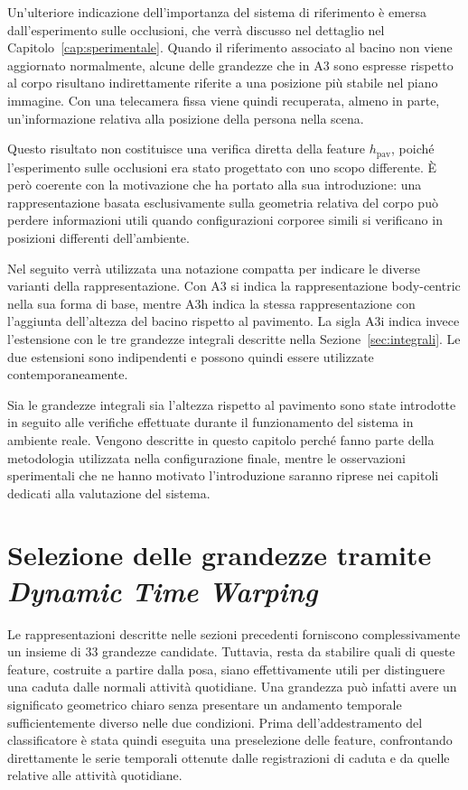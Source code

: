 Un'ulteriore indicazione dell'importanza del sistema di riferimento è emersa dall'esperimento sulle occlusioni, che verrà discusso nel dettaglio nel Capitolo~\ref{cap:sperimentale}. Quando il riferimento associato al bacino non viene aggiornato normalmente, alcune delle grandezze che in A3 sono espresse rispetto al corpo risultano indirettamente riferite a una posizione più stabile nel piano immagine. Con una telecamera fissa viene quindi recuperata, almeno in parte, un'informazione relativa alla posizione della persona nella scena.

Questo risultato non costituisce una verifica diretta della feature $h_{\text{pav}}$, poiché l'esperimento sulle occlusioni era stato progettato con uno scopo differente. È però coerente con la motivazione che ha portato alla sua introduzione: una rappresentazione basata esclusivamente sulla geometria relativa del corpo può perdere informazioni utili quando configurazioni corporee simili si verificano in posizioni differenti dell'ambiente.

Nel seguito verrà utilizzata una notazione compatta per indicare le diverse varianti della rappresentazione. Con A3 si indica la rappresentazione body-centric nella sua forma di base, mentre A3h indica la stessa rappresentazione con l'aggiunta dell'altezza del bacino rispetto al pavimento. La sigla A3i indica invece l'estensione con le tre grandezze integrali descritte nella Sezione~\ref{sec:integrali}. Le due estensioni sono indipendenti e possono quindi essere utilizzate contemporaneamente.

Sia le grandezze integrali sia l'altezza rispetto al pavimento sono state introdotte in seguito alle verifiche effettuate durante il funzionamento del sistema in ambiente reale. Vengono descritte in questo capitolo perché fanno parte della metodologia utilizzata nella configurazione finale, mentre le osservazioni sperimentali che ne hanno motivato l'introduzione saranno riprese nei capitoli dedicati alla valutazione del sistema.

\section{Selezione delle grandezze tramite \emph{Dynamic Time Warping}}
\label{sec:dtw}

Le rappresentazioni descritte nelle sezioni precedenti forniscono complessivamente un insieme di 33 grandezze candidate.
Tuttavia, resta da stabilire quali di queste feature, costruite a partire dalla posa, siano effettivamente utili per distinguere una caduta dalle normali attività quotidiane. Una grandezza può infatti avere un significato geometrico chiaro senza presentare un andamento temporale sufficientemente diverso nelle due condizioni.
Prima dell'addestramento del classificatore è stata quindi eseguita una preselezione delle feature, confrontando direttamente le serie temporali ottenute dalle registrazioni di caduta e da quelle relative alle attività quotidiane.


